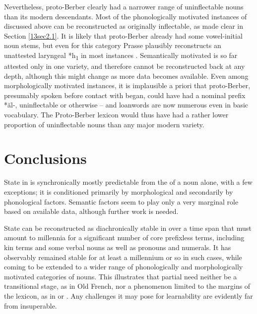 \documentclass[output=paper,colorlinks,citecolor=brown]{langscibook}
\begin{document}
Nevertheless, proto-Berber clearly had a narrower range of uninflectable nouns than its modern descendants. Most of the phonologically motivated instances of   discussed above can be reconstructed as originally inflectable, as made clear in Section \ref{13sec2.1}. It is likely that proto-Berber already had some vowel-initial noun stems, but even for this category Prasse plausibly reconstructs an unattested laryngeal *h\textsubscript{1} in most instances \citep{prasse1969, prasse2011}. Semantically motivated   is so far attested only in one variety, and therefore cannot be reconstructed back at any depth, although this might change as more data becomes available. Even among morphologically motivated instances, it is implausible a priori that proto-Berber, presumably spoken before contact with  began, could have had a nominal prefix *ăl-, uninflectable or otherwise -- and  loanwords are now numerous even in basic vocabulary. The Proto-Berber lexicon would thus have had a rather lower proportion of uninflectable nouns than any major modern  variety.

\section{Conclusions} \label{13sec4}

State  in  is synchronically mostly predictable from the  of a noun alone, with a few exceptions; it is conditioned primarily by morphological and secondarily by phonological factors. Semantic factors seem to play only a very marginal role based on available data, although further work is needed.

State  can be reconstructed as diachronically stable in  over a time span that must amount to millennia for a significant number of core prefixless terms, including kin terms and some verbal nouns as well as pronouns and numerals. It has observably remained stable for at least a millennium or so in such cases, while coming to be extended to a wider range of phonologically and morphologically motivated categories of  nouns. This illustrates that partial  need neither be a transitional stage, as in Old French, nor a phenomenon limited to the margins of the lexicon, as in  or . Any challenges it may pose for learnability are evidently far from insuperable.
 
\end{document}
